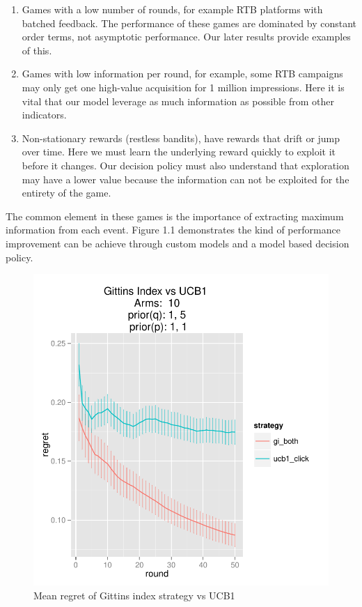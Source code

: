 \documentclass[11pt,a4,singlespacing,titlepagenumber=on]{scrreprt}
\numberwithin{equation}{chapter} %
\theoremstyle{remark}
\begin{document}
\begin{enumerate}
	\item Games with a low number of rounds, for example RTB platforms with batched feedback. The performance of these games are dominated by constant order terms, not asymptotic performance. Our later results provide examples of this. 
	\item Games with low information per round, for example, some RTB campaigns may only get one high-value acquisition for 1 million impressions. Here it is vital that our model leverage as much information as possible from other indicators.
	\item Non-stationary rewards (restless bandits), have rewards that drift or jump over time. Here we must learn the underlying reward quickly to exploit it before it changes. Our decision policy must also understand that exploration may have a lower value because the information can not be exploited for the entirety of the game.
\end{enumerate}

The common element in these games is the importance of extracting maximum information from each event. Figure 1.1 demonstrates the kind of performance improvement can be achieve through custom models and a model based decision policy.

\begin{figure}[H]
    \centering
    \includegraphics[scale=0.7]{GIvsUCB1.pdf}
    \caption{Mean regret of Gittins index strategy vs UCB1}
    \label{fig:GIvsUCB1}
\end{figure}
\end{document}
